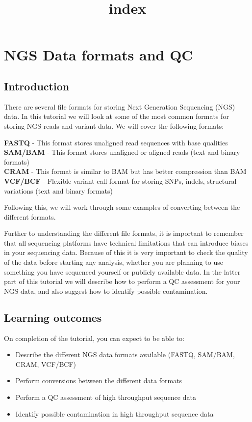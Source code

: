 \documentclass[11pt]{article}
\title{index}
\providecommand{\tightlist}{%
      \setlength{\itemsep}{0pt}\setlength{\parskip}{0pt}}
\begin{document}
    \hypertarget{ngs-data-formats-and-qc}{%
\section{NGS Data formats and QC}\label{ngs-data-formats-and-qc}}

\hypertarget{introduction}{%
\subsection{Introduction}\label{introduction}}

There are several file formats for storing Next Generation Sequencing
(NGS) data. In this tutorial we will look at some of the most common
formats for storing NGS reads and variant data. We will cover the
following formats:

\textbf{FASTQ} - This format stores unaligned read sequences with base
qualities\\
\textbf{SAM/BAM} - This format stores unaligned or aligned reads (text
and binary formats)\\
\textbf{CRAM} - This format is similar to BAM but has better compression
than BAM\\
\textbf{VCF/BCF} - Flexible variant call format for storing SNPs,
indels, structural variations (text and binary formats)

Following this, we will work through some examples of converting between
the different formats.

Further to understanding the different file formats, it is important to
remember that all sequencing platforms have technical limitations that
can introduce biases in your sequencing data. Because of this it is very
important to check the quality of the data before starting any analysis,
whether you are planning to use something you have sequenced yourself or
publicly available data. In the latter part of this tutorial we will
describe how to perform a QC assessment for your NGS data, and also
suggest how to identify possible contamination.

\hypertarget{learning-outcomes}{%
\subsection{Learning outcomes}\label{learning-outcomes}}

On completion of the tutorial, you can expect to be able to:

\begin{itemize}
\tightlist
\item
  Describe the different NGS data formats available (FASTQ, SAM/BAM,
  CRAM, VCF/BCF)
\item
  Perform conversions between the different data formats
\item
  Perform a QC assessment of high throughput sequence data
\item
  Identify possible contamination in high throughput sequence data
\end{itemize}
\end{document}
